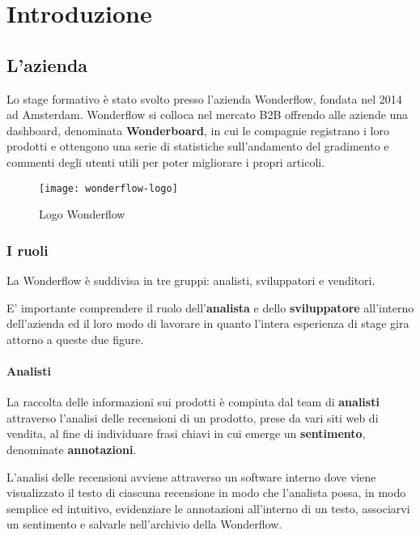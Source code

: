 \mainmatter
\chapter{Introduzione}
\label{cap:introduzione}

\section{L'azienda}
Lo stage formativo è stato svolto presso l'azienda Wonderflow, fondata nel 2014
ad Amsterdam. Wonderflow si colloca nel mercato \gls{B2B}
offrendo alle aziende una \gls{dashboard}, denominata \textbf{Wonderboard}, in
cui le compagnie registrano i loro prodotti e ottengono una serie di
statistiche sull'andamento del gradimento e commenti degli utenti utili per
poter migliorare i propri articoli.

\begin{figure}[htbp]
\begin{center}
\texttt{[image: wonderflow-logo]}
\caption{Logo Wonderflow}
\end{center}
\end{figure}

\subsection{I ruoli}
La Wonderflow è suddivisa in tre gruppi: analisti, sviluppatori e venditori.

E' importante comprendere il ruolo dell'\textbf{analista} e dello
\textbf{sviluppatore} all'interno dell'azienda ed il loro modo di lavorare in
quanto l'intera esperienza di stage gira attorno a queste due figure.

\subsubsection{Analisti}
La raccolta delle informazioni sui prodotti è compiuta dal team di
\textbf{analisti} attraverso l'analisi delle recensioni di un prodotto, prese
da vari siti web di vendita, al fine di individuare frasi chiavi in cui
emerge un \textbf{sentimento}, denominate \textbf{annotazioni}.
\newline

L'analisi delle recensioni avviene attraverso un software interno dove viene
visualizzato il testo di ciascuna recensione in modo che l'analista possa, in
modo semplice ed intuitivo, evidenziare le annotazioni all'interno di un testo,
associarvi un sentimento e salvarle nell'archivio della Wonderflow.
\newline

